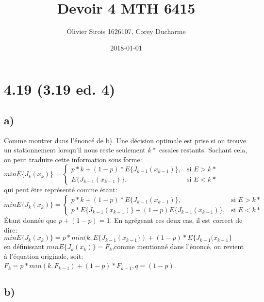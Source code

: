 \documentclass[oneside]{book}
\title{Devoir 4 MTH 6415}
\date{2018-01-01}
\author{Olivier Sirois 1626107, Corey Ducharme}
\begin{document}
\setcounter{page}{1}
\maketitle
\section*{4.19 (3.19 ed. 4)}
\subsection*{a)}
Comme montrer dans l'énoncé de b). Une décision optimale est prise si on trouve un stationnement lorsqu'il nous reste seulement $k*$ essaies restants. Sachant cela, on peut traduire cette information sous forme:\\


\begin{math}
min E \{ J_k(x_k) \} = 
\begin{cases}
p*k + (1-p)*E\{J_{k-1}(x_{k-1})\}, & \text{si } E > k*\\
E\{J_{k-1}(x_{k-1})\}, & \text{si } E < k*
\end{cases}
\end{math}\\


qui peut être représenté comme étant:\\

\begin{math}
min E \{ J_k(x_k) \} = 
\begin{cases}
p*k + (1-p)*E\{J_{k-1}(x_{k-1})\}, & \text{si } E > k*\\
p*E\{J_{k-1}(x_{k-1})\} + (1-p)E\{J_{k-1}(x_{k-1})\}, & \text{si } E < k*
\end{cases}
\end{math}\\

Étant donnée que $p + (1-p) = 1$. En agrégeant ces deux cas, il est correct de dire:\\

$min E \{ J_k(x_k) \} = p*min(k,E\{J_{k-1}(x_{k-1}\}) + (1-p)*E\{J_{k-1}(x_{k-1}\}$\\

en définissant $minE\{J_k(x_k)\} = F_k$,comme mentionné dans l'énoncé, on revient à l'équation originale, soit:\\

$F_k = p*min(k, F_{k-1}) + (1-p)*F_{k-1}, q = (1-p)$.

\subsection*{b)}
\end{document}

